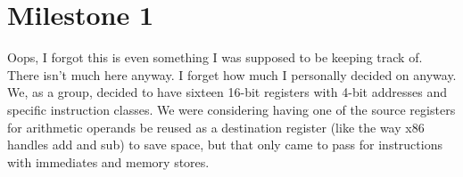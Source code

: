 
\chapter{Milestone 1}
Oops, I forgot this is even something I was supposed to be keeping track of.
There isn't much here anyway. I forget how much I personally decided on anyway.
We, as a group, decided to have sixteen 16-bit registers with 4-bit addresses
and specific instruction classes. We were considering having one of the source
registers for arithmetic operands be reused as a destination register (like the
way x86 handles add and sub) to save space, but that only came to pass for
instructions with immediates and memory stores.

